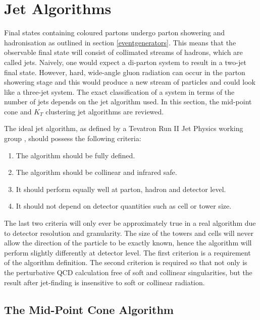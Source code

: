 \section{Jet Algorithms}

Final states containing coloured partons undergo parton showering and hadronisation as outlined in section \ref{eventgenerators}. This means  that the observable final state will consist of collimated streams of hadrons, which are called jets. Naively, one would expect a di-parton system to result in a two-jet final state. However, hard, wide-angle gluon radiation can occur in the parton showering stage and this would produce a new stream of particles and could look like a three-jet system. The exact classification of a system in terms of the number of jets depends on the jet algorithm used. In this section, the mid-point cone and $K_T$ clustering jet algorithms are reviewed.

The ideal jet algorithm, as defined by a Tevatron Run II Jet Physics working group \cite{Blazey:2000qt}, should possess the following criteria:
\begin{enumerate}
\item The algorithm should be fully defined.
\item The algorithm should be collinear and infrared safe.
\item It should perform equally well at parton, hadron and detector level.
\item It should not depend on detector quantities such as cell or tower size.
\end{enumerate}
The last two criteria will only ever be approximately true in a real algorithm due to detector resolution and granularity. The size of the towers and cells will never allow the direction of the particle to be exactly known, hence the algorithm will perform slightly differently at detector level. The first criterion is a requirement of the algorithm definition. The second criterion is required so that not only is the perturbative QCD calculation free of soft and collinear singularities, but the result after jet-finding is insensitive to soft or collinear radiation.

\subsection{The Mid-Point Cone Algorithm}

